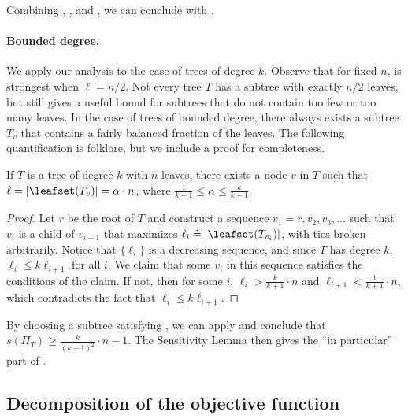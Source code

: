 \documentclass{toc}
\begin{document}
Combining , , and , we can conclude with .

\paragraph{Bounded degree.}
We apply our analysis to the case of trees of degree $k$. Observe that for fixed $n$,  is strongest when $\ell=n/2$. Not every tree $T$ has a subtree with exactly $n/2$ leaves, but  still gives a useful bound for subtrees that do not contain too few or too many leaves. In the case of trees of bounded degree, there always exists a subtree $T_v$ that contains a fairly balanced fraction of the leaves. The following quantification is folklore, but we include a proof for completeness.
 
\begin{fact}
    \label{fact:k-ary:balance}
    If $T$ is a tree of degree $k$ with $n$ leaves, there exists a node $v$ in $T$ such that $\ell \doteq \lvert\leafset(T_v)\rvert = \alpha 
    \cdot n$, where $\frac{1}{k+1} \le \alpha \le \frac{k}{k+1}$.
\end{fact}

\begin{proof}
    Let $r$ be the root of $T$ and construct a sequence $v_1=r,v_2,v_3,\dots$ such that $v_{i}$ is a child of $v_{i-1}$ that maximizes $\ell_{i} \doteq \lvert\leafset(T_{v_{i}})\rvert$, with ties broken arbitrarily. Notice that $\{\ell_i\}$ is a decreasing sequence, and since $T$ has degree $k$, $\ell_{i} \le k\ell_{i+1}$ for all $i$. We claim that some $v_i$ in this sequence satisfies the conditions of the claim. If not, then for some $i$, $\ell_i> \frac{k}{k+1}\cdot n$ and $\ell_{i+1}< \frac{1}{k+1}\cdot n$, which contradicts the fact that $\ell_i\le k\ell_{i+1}$.
\end{proof}

By choosing a subtree satisfying , we can apply  and conclude that $s(\Pi_T)\ge \frac{k}{(k+1)^2} \cdot n -1$. The Sensitivity Lemma then gives the ``in particular'' part of .

\subsection{Decomposition of the objective function}
\label{sec:decomposition}
\end{document}
